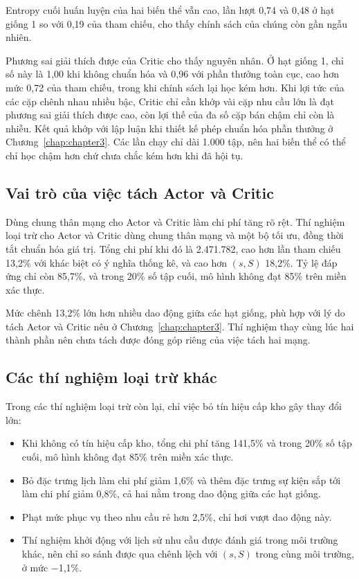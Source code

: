 Entropy cuối huấn luyện của hai biến thể vẫn cao, lần lượt 0,74 và 0,48 ở hạt giống 1 so với 0,19 của tham chiếu, cho thấy chính sách của chúng còn gần ngẫu nhiên.

Phương sai giải thích được của Critic cho thấy nguyên nhân. Ở hạt giống 1, chỉ số này là 1,00 khi không chuẩn hóa và 0,96 với phần thưởng toàn cục, cao hơn mức 0,72 của tham chiếu, trong khi chính sách lại học kém hơn. Khi lợi tức của các cặp chênh nhau nhiều bậc, Critic chỉ cần khớp vài cặp nhu cầu lớn là đạt phương sai giải thích được cao, còn lợi thế của đa số cặp bán chậm chỉ còn là nhiễu. Kết quả khớp với lập luận khi thiết kế phép chuẩn hóa phần thưởng ở Chương~\ref{chap:chapter3}. Các lần chạy chỉ dài 1.000 tập, nên hai biến thể có thể chỉ học chậm hơn chứ chưa chắc kém hơn khi đã hội tụ.

\subsection{Vai trò của việc tách Actor và Critic}
\label{subsec:ablationTrunk}

Dùng chung thân mạng cho Actor và Critic làm chi phí tăng rõ rệt. Thí nghiệm loại trừ cho Actor và Critic dùng chung thân mạng và một bộ tối ưu, đồng thời tắt chuẩn hóa giá trị. Tổng chi phí khi đó là 2.471.782, cao hơn lần tham chiếu 13,2\% với khác biệt có ý nghĩa thống kê, và cao hơn $(s,S)$ 18,2\%. Tỷ lệ đáp ứng chỉ còn 85,7\%, và trong 20\% số tập cuối, mô hình không đạt 85\% trên miền xác thực.

Mức chênh 13,2\% lớn hơn nhiều dao động giữa các hạt giống, phù hợp với lý do tách Actor và Critic nêu ở Chương~\ref{chap:chapter3}. Thí nghiệm thay cùng lúc hai thành phần nên chưa tách được đóng góp riêng của việc tách hai mạng.

\subsection{Các thí nghiệm loại trừ khác}
\label{subsec:ablationKhac}

Trong các thí nghiệm loại trừ còn lại, chỉ việc bỏ tín hiệu cấp kho gây thay đổi lớn:
\begin{itemize}
    \item Khi không có tín hiệu cấp kho, tổng chi phí tăng 141,5\% và trong 20\% số tập cuối, mô hình không đạt 85\% trên miền xác thực.
    \item Bỏ đặc trưng lịch làm chi phí giảm 1,6\% và thêm đặc trưng sự kiện sắp tới làm chi phí giảm 0,8\%, cả hai nằm trong dao động giữa các hạt giống.
    \item Phạt mức phục vụ theo nhu cầu rẻ hơn 2,5\%, chỉ hơi vượt dao động này.
    \item Thí nghiệm khởi động với lịch sử nhu cầu được đánh giá trong môi trường khác, nên chỉ so sánh được qua chênh lệch với $(s,S)$ trong cùng môi trường, ở mức $-$1,1\%.
\end{itemize}

